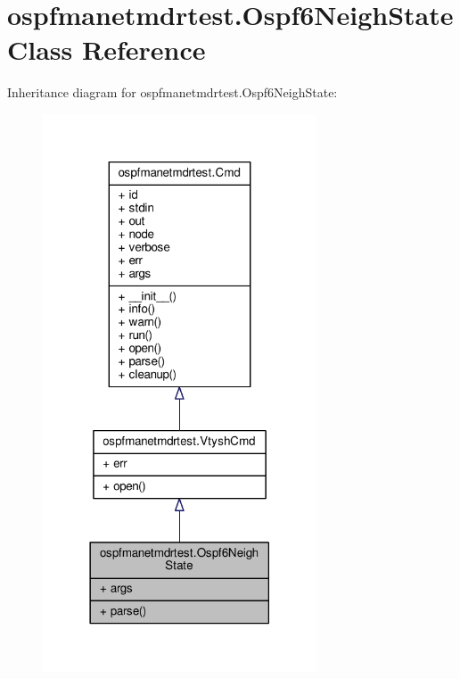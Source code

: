 \hypertarget{classospfmanetmdrtest_1_1_ospf6_neigh_state}{\section{ospfmanetmdrtest.\+Ospf6\+Neigh\+State Class Reference}
\label{classospfmanetmdrtest_1_1_ospf6_neigh_state}
}


Inheritance diagram for ospfmanetmdrtest.\+Ospf6\+Neigh\+State\+:
\nopagebreak
\begin{figure}[H]
\begin{center}
\leavevmode
\includegraphics[width=230pt]{classospfmanetmdrtest_1_1_ospf6_neigh_state__inherit__graph}
\end{center}
\end{figure}


